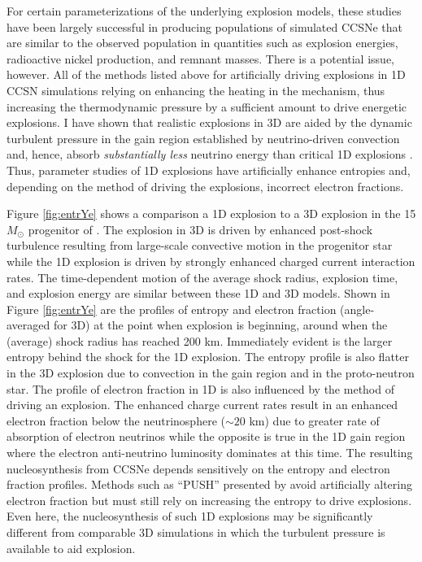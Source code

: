 For certain parameterizations of the underlying explosion models, these studies have been largely successful in producing populations of simulated CCSNe that are similar to the observed population in quantities such as explosion energies, radioactive nickel production, and remnant masses.
There is a potential issue, however.
All of the methods listed above for artificially driving explosions in 1D CCSN simulations relying on enhancing the heating in the mechanism, thus increasing the thermodynamic pressure by a sufficient amount to drive energetic explosions.
I have shown that realistic explosions in 3D are aided by the dynamic turbulent pressure in the gain region established by neutrino-driven convection and, hence, absorb {\it substantially less} neutrino energy than critical 1D explosions \citep{Couch:2015}.
Thus, parameter studies of 1D explosions have artificially enhance entropies and, depending on the method of driving the explosions, incorrect electron fractions.


Figure \ref{fig:entrYe} shows a comparison a 1D explosion to a 3D explosion in the 15 $M_\odot$ progenitor of \citet{Woosley:2007d}.
The explosion in 3D is driven by enhanced post-shock turbulence resulting from large-scale convective motion in the progenitor star \citep[from][]{Couch:2013b} while the 1D explosion is driven by strongly enhanced charged current interaction rates.
The time-dependent motion of the average shock radius, explosion time, and explosion energy are similar between these 1D and 3D models.
Shown in Figure \ref{fig:entrYe} are the profiles of entropy and electron fraction (angle-averaged for 3D) at the point when explosion is beginning, around when the (average) shock radius has reached 200 km.
Immediately evident is the larger entropy behind the shock for the 1D explosion.
The entropy profile is also flatter in the 3D explosion due to convection in the gain region and in the proto-neutron star.
The profile of electron fraction in 1D is also influenced by the method of driving an explosion.
The enhanced charge current rates result in an enhanced electron fraction below the neutrinosphere ($\sim20$ km) due to greater rate of absorption of electron neutrinos while the opposite is true in the 1D gain region where the electron anti-neutrino luminosity dominates at this time.
The resulting nucleosynthesis from CCSNe depends sensitively on the entropy and electron fraction profiles.
Methods such as ``PUSH'' presented by \citet{Perego:2015} avoid artificially altering electron fraction but must still rely on increasing the entropy to drive explosions.
Even here, the nucleosynthesis of such 1D explosions may be significantly different from comparable 3D simulations in which the turbulent pressure is available to aid explosion.




